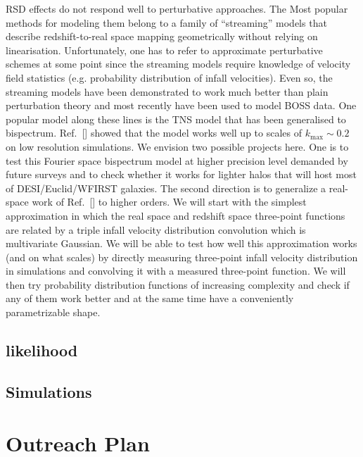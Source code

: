 RSD effects do not respond well to perturbative approaches. The Most popular
methods for modeling them belong to a family of ``streaming'' models that
describe redshift-to-real space mapping geometrically without relying on
linearisation. Unfortunately, one has to refer to approximate perturbative
schemes at some point since the streaming models require knowledge of velocity
field statistics (e.g. probability distribution of infall velocities). Even so,
the streaming models have been demonstrated to work much better than plain
perturbation theory and most recently have been used to model BOSS data. One
popular model along these lines is the TNS model that has been generalised to
bispectrum. Ref.~[] showed that the model works well up to scales of
$k_\mathrm{max} \sim 0.2$ on low resolution simulations. We envision two
possible projects here. One is to test this Fourier space bispectrum model at
higher precision level demanded by future surveys and to check whether it works
for lighter halos that will host most of DESI/Euclid/WFIRST galaxies. The
second direction is to generalize a real-space work of Ref.~[] to higher
orders. We will start with the simplest approximation in which the real space
and redshift space three-point functions are related by a triple infall
velocity distribution convolution which is multivariate Gaussian. We will be
able to test how well this approximation works (and on what scales) by directly
measuring three-point infall velocity distribution in simulations and
convolving it with a measured three-point function. We will then try
probability distribution functions of increasing complexity and check if any of
them work better and at the same time have a conveniently parametrizable shape.

\subsection*{likelihood}


\subsection*{Simulations}


\section{Outreach Plan}


